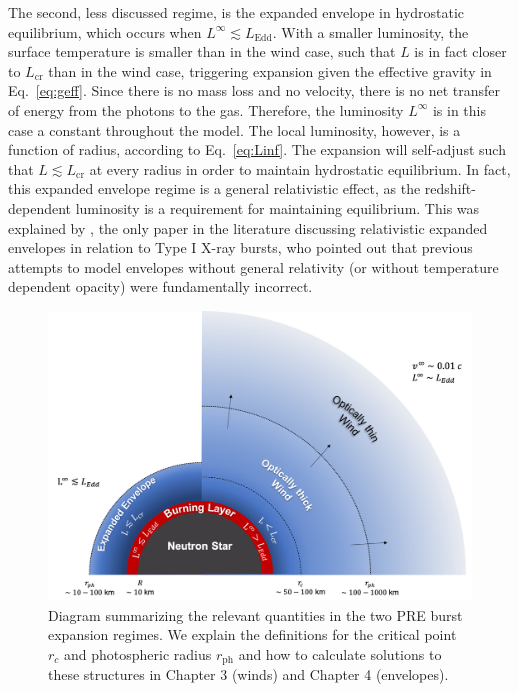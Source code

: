 \documentclass[../main.tex]{subfiles}
\newcommand{\Lcr}{L_\text{cr}}
\newcommand{\Ledd}{L_\text{Edd}}
\begin{document}
The second, less discussed regime, is the expanded envelope in hydrostatic equilibrium, which occurs when $L^\infty \lesssim \Ledd$. With a smaller luminosity, the surface temperature is smaller than in the wind case, such that $L$ is in fact closer to $\Lcr$ than in the wind case, triggering expansion given the effective gravity in Eq.~\eqref{eq:geff}. Since there is no mass loss and no velocity, there is no net transfer of energy from the photons to the gas. Therefore, the luminosity $L^\infty$ is in this case a constant throughout the model. The local luminosity, however, is a function of radius, according to Eq.~\eqref{eq:Linf}. The expansion will self-adjust such that $L\lesssim \Lcr$ at every radius in order to maintain hydrostatic equilibrium. In fact, this expanded envelope regime is a general relativistic effect, as the redshift-dependent luminosity is a requirement for maintaining equilibrium. This was explained by \citet{Paczynski1986a}, the only paper in the literature discussing relativistic expanded envelopes in relation to Type I X-ray bursts, who pointed out that previous attempts to model envelopes without general relativity (or without temperature dependent opacity) were fundamentally incorrect.\\

\begin{figure}
    \centering
    \includegraphics[width=\textwidth]{figures/diagram.png}
    \caption{Diagram summarizing the relevant quantities in the two PRE burst expansion regimes. We explain the definitions for the critical point $r_c$ and photospheric radius $r_\text{ph}$ and how to calculate solutions to these structures in Chapter 3 (winds) and Chapter 4 (envelopes).}
    \label{fig:diagram}
\end{figure}
\end{document}
